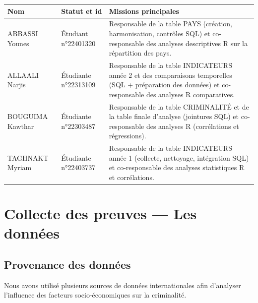 \documentclass[mstat,12pt]{unswthesis}
\begin{document}
\begin{longtable}[]{@{}
  >{\raggedright\arraybackslash}p{}
  >{\raggedright\arraybackslash}p{}
  >{\raggedright\arraybackslash}p{}@{}}
\toprule\noalign{}
\begin{minipage}[b]{\linewidth}\raggedright
Nom
\end{minipage} & \begin{minipage}[b]{\linewidth}\raggedright
Statut et id
\end{minipage} & \begin{minipage}[b]{\linewidth}\raggedright
Missions principales
\end{minipage} \\
\midrule\noalign{}
\endhead
\bottomrule\noalign{}
\endlastfoot
ABBASSI Younes & Étudiant n°22401320 & Responsable de la table PAYS
(création, harmonisation, contrôles SQL) et co-responsable des analyses
descriptives R sur la répartition des pays. \\
ALLAALI Narjis & Étudiante n°22313109 & Responsable de la table
INDICATEURS année 2 et des comparaisons temporelles (SQL + préparation
des données) et co-responsable des analyses R comparatives. \\
BOUGUIMA Kawthar & Étudiante n°22303487 & Responsable de la table
CRIMINALITÉ et de la table finale d'analyse (jointures SQL) et
co-responsable des analyses R (corrélations et régressions). \\
TAGHNAKT Myriam & Étudiante n°22403737 & Responsable de la table
INDICATEURS année 1 (collecte, nettoyage, intégration SQL) et
co-responsable des analyses statistiques R et corrélations. \\
\end{longtable}

\chapter{Collecte des preuves --- Les
données}\label{collecte-des-preuves-les-donnuxe9es}

\section{Provenance des données}\label{provenance-des-donnuxe9es}

Nous avons utilisé plusieurs sources de données internationales afin
d'analyser l'influence des facteurs socio-économiques sur la
criminalité.
\end{document}
